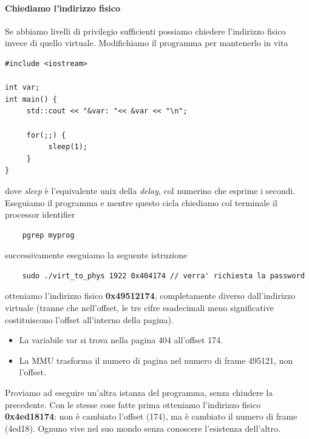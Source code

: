 \documentclass[11pt]{report}
\theoremstyle{definition}
\begin{document}
\paragraph{Chiediamo l'indirizzo fisico} Se abbiamo livelli di privilegio sufficienti possiamo chiedere l'indirizzo fisico invece di quello virtuale. Modifichiamo il programma per mantenerlo in vita
\begin{verbatim}
#include <iostream>
	
int var;
int main() {
     std::cout << "&var: "<< &var << "\n";
		
     for(;;) {
          sleep(1);
     }
}
\end{verbatim}
dove \emph{sleep} è l'equivalente unix della \emph{delay}, col numerino che esprime i secondi. Eseguiamo il programma e mentre questo cicla chiediamo col terminale il processor identifier
\begin{verbatim}
	pgrep myprog
\end{verbatim}
successivamente eseguiamo la seguente istruzione
\begin{verbatim}
	sudo ./virt_to_phys 1922 0x404174 // verra' richiesta la password
\end{verbatim}
otteniamo l'indirizzo fisico \textbf{0x49512174}, completamente diverso dall'indirizzo virtuale (tranne che nell'offset, le tre cifre esadecimali meno significative costituiscono l'offset all'interno della pagina).
\begin{itemize}
	\item La variabile var si trova nella pagina 404 all'offset 174.
	\item La MMU trasforma il numero di pagina nel numero di frame 495121, non l'offset.
\end{itemize}
Proviamo ad eseguire un'altra istanza del programma, senza chiudere la precedente. Con le stesse cose fatte prima otteniamo l'indirizzo fisico \textbf{0x4ed18174}: non è cambiato l'offset (174), ma è cambiato il numero di frame (4ed18). Ognuno vive nel suo mondo senza conoscere l'esistenza dell'altro.
\end{document}

